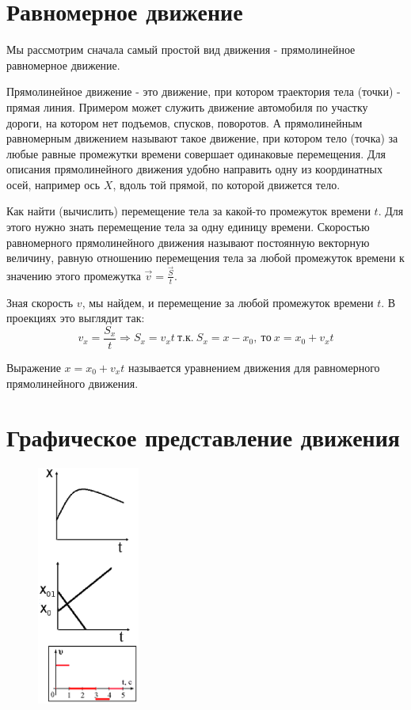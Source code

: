 \documentclass[a5paper, 10pt]{diss_4}
\renewcommand{\'}{\,'}
\begin{document}
\section{Равномерное движение}

  Мы рассмотрим сначала самый простой вид движения - прямолинейное
равномерное движение.

 Прямолинейное движение - это движение, при котором траектория тела (точки) -
прямая линия. Примером может служить движение автомобиля по участку дороги, на
котором нет подъемов, спусков, поворотов. А прямолинейным равномерным движением
называют такое движение, при котором тело (точка) за любые равные промежутки
времени совершает одинаковые перемещения. Для описания прямолинейного движения
удобно направить одну из координатных осей, например ось $X$, вдоль той прямой,
по которой движется тело.

  Как найти (вычислить) перемещение тела за какой-то промежуток времени
$t$. Для этого нужно знать перемещение тела за одну единицу времени. Скоростью
равномерного прямолинейного движения называют постоянную векторную величину,
равную отношению перемещения тела за любой промежуток времени к значению этого
промежутка $\vec{v}=\frac{\vec{S}}{t}$.

  Зная скорость $v$, мы найдем, и перемещение за любой промежуток времени $t$.
В проекциях это выглядит так:
\[
v_x=\frac{S_x}{t}\Rightarrow S_x=v_x t\ т.к.\ S_x=x-x_0,\ то\ x=x_0+v_xt
\]

 Выражение $x=x_0+v_xt$ называется уравнением движения для равномерного
прямолинейного движения.
\newpage
\section{Графическое представление движения}

\begin{figure}
\includegraphics[width=0.3\textwidth]{img/img07.eps}
\caption{}
\label{fig7}
\end{figure}
\end{document}
